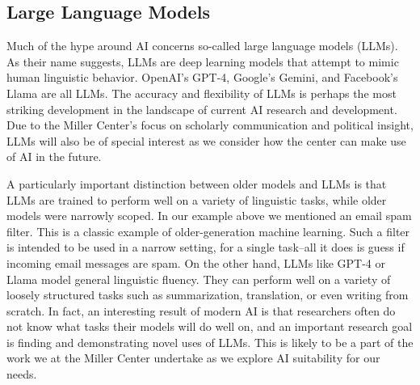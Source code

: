 \documentclass[12pt, oneside]{article}   	%
\begin{document}
\subsection{Large Language Models}\label{section.definitions.llms}
Much of the hype around AI concerns so-called large language models (LLMs).  As their name suggests, LLMs are deep learning models that attempt to mimic human linguistic behavior.  OpenAI’s GPT-4, Google’s Gemini, and Facebook’s Llama are all LLMs.  The accuracy and flexibility of LLMs is perhaps the most striking development in the landscape of current AI research and development.  Due to the Miller Center’s focus on scholarly communication and political insight, LLMs will also be of special interest as we consider how the center can make use of AI in the future.

A particularly important distinction between older models and LLMs is that LLMs are trained to perform well on a variety of linguistic tasks, while older models were narrowly scoped.  In our example above we mentioned an email spam filter.  This is a classic example of older-generation machine learning.  Such a filter is intended to be used in a narrow setting, for a single task--all it does is guess if incoming email messages are spam.  On the other hand, LLMs like GPT-4 or Llama model general linguistic fluency.  They can perform well on a variety of loosely structured tasks such as summarization, translation, or even writing from scratch.  In fact, an interesting result of modern AI is that researchers often do not know what tasks their models will do well on, and an important research goal is finding and demonstrating novel uses of LLMs.  This is likely to be a part of the work we at the Miller Center undertake as we explore AI suitability for our needs.
\end{document}

